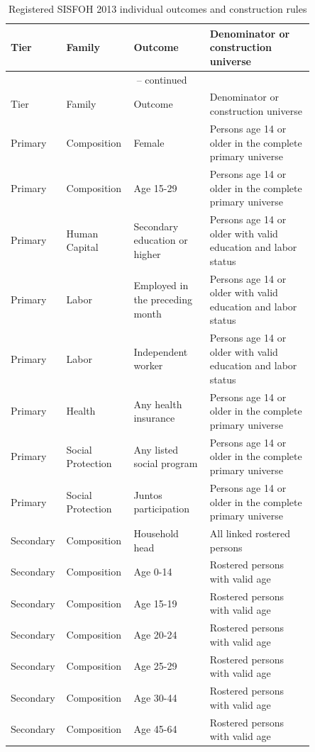 \begingroup
\small
\begin{longtable}{p{0.10\linewidth}p{0.18\linewidth}p{0.24\linewidth}p{0.33\linewidth}}
\caption{Registered SISFOH 2013 individual outcomes and construction rules}
\label{tab:rd_outcome_registry_2013_individual} \\
\toprule
Tier & Family & Outcome & Denominator or construction universe \\
\midrule
\endfirsthead
\multicolumn{4}{c}{\tablename\ \thetable{} -- continued} \\
\toprule
Tier & Family & Outcome & Denominator or construction universe \\
\midrule
\endhead
Primary & Composition & Female & Persons age 14 or older in the complete primary universe \\
Primary & Composition & Age 15-29 & Persons age 14 or older in the complete primary universe \\
Primary & Human Capital & Secondary education or higher & Persons age 14 or older with valid education and labor status \\
Primary & Labor & Employed in the preceding month & Persons age 14 or older with valid education and labor status \\
Primary & Labor & Independent worker & Persons age 14 or older with valid education and labor status \\
Primary & Health & Any health insurance & Persons age 14 or older in the complete primary universe \\
Primary & Social Protection & Any listed social program & Persons age 14 or older in the complete primary universe \\
Primary & Social Protection & Juntos participation & Persons age 14 or older in the complete primary universe \\
Secondary & Composition & Household head & All linked rostered persons \\
Secondary & Composition & Age 0-14 & Rostered persons with valid age \\
Secondary & Composition & Age 15-19 & Rostered persons with valid age \\
Secondary & Composition & Age 20-24 & Rostered persons with valid age \\
Secondary & Composition & Age 25-29 & Rostered persons with valid age \\
Secondary & Composition & Age 30-44 & Rostered persons with valid age \\
Secondary & Composition & Age 45-64 & Rostered persons with valid age \\

\end{longtable}
